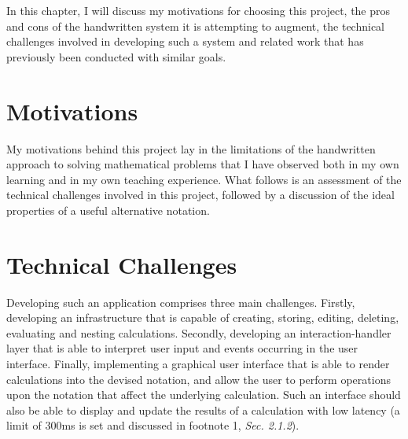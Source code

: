 \documentclass[12pt,twoside,notitlepage,xetex]{report}
\begin{document}
In this chapter, I will discuss my motivations for choosing this project, the pros and cons of the handwritten system it is attempting to augment, the technical challenges involved in developing such a system and related work that has previously been conducted with similar goals.

\section{Motivations}

My motivations behind this project lay in the limitations of the handwritten approach to solving mathematical problems that I have observed both in my own learning and in my own teaching experience.  What follows is an assessment of the technical challenges involved in this project, followed by a discussion of the ideal properties of a useful alternative notation.

\pagebreak



\section{Technical Challenges}

Developing such an application comprises three main challenges.  Firstly, developing an infrastructure that is capable of creating, storing, editing, deleting, evaluating and nesting calculations.  Secondly, developing an interaction-handler layer that is able to interpret user input and events occurring in the user interface.  Finally, implementing a graphical user interface that is able to render calculations into the devised notation, and allow the user to perform operations upon the notation that affect the underlying calculation.  Such an interface should also be able to display and update the results of a calculation with low latency (a limit of 300ms is set and discussed in footnote 1, \emph{Sec. 2.1.2}).
\end{document}
